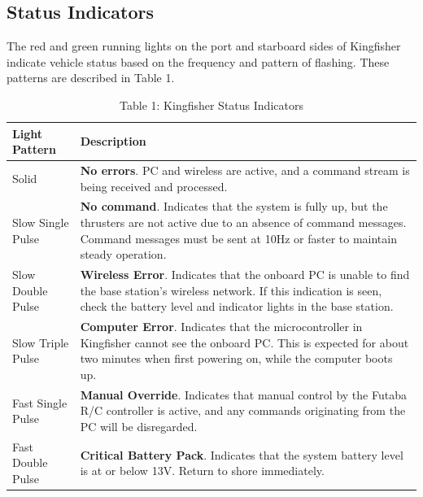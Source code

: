 \documentclass[]{clearpath-latex/clearpath-manual}
\begin{document}
\subsection{Status Indicators}
The red and green running lights on the port and starboard sides of Kingfisher indicate vehicle status based on the frequency and pattern of flashing. These patterns are described in Table 1.


\begin{table}[]
\centering
\caption{Table 1: Kingfisher Status Indicators}
\label{kf-statusindicator}
\begin{tabular}{ll}
\rowcolor{lightgrey} 
Light Pattern     & Description                                                                                                                                                                                              \\ \hline
Solid             & \textbf{No errors}. PC and wireless are active, and a command stream is being received and processed.                                                                                                             \\ \hline
Slow Single Pulse & \textbf{No command}. Indicates that the system is fully up, but the thrusters are not active due to an absence of command messages. Command messages must be sent at 10Hz or faster to maintain steady operation. \\ \hline
Slow Double Pulse & \textbf{Wireless Error}. Indicates that the onboard PC is unable to find the base station’s wireless network. If this indication is seen, check the battery level and indicator lights in the base station.       \\ \hline
Slow Triple Pulse & \textbf{Computer Error}. Indicates that the microcontroller in Kingfisher cannot see the onboard PC. This is expected for about two minutes when first powering on, while the computer boots up.                  \\ \hline
Fast Single Pulse & \textbf{Manual Override}. Indicates that manual control by the Futaba R/C controller is active, and any commands originating from the PC will be disregarded.                                                     \\ \hline
Fast Double Pulse & \textbf{Critical Battery Pack}. Indicates that the system battery level is at or below 13V. Return to shore immediately. \hline                                                                                        
\end{tabular}
\end{table}
\end{document}
